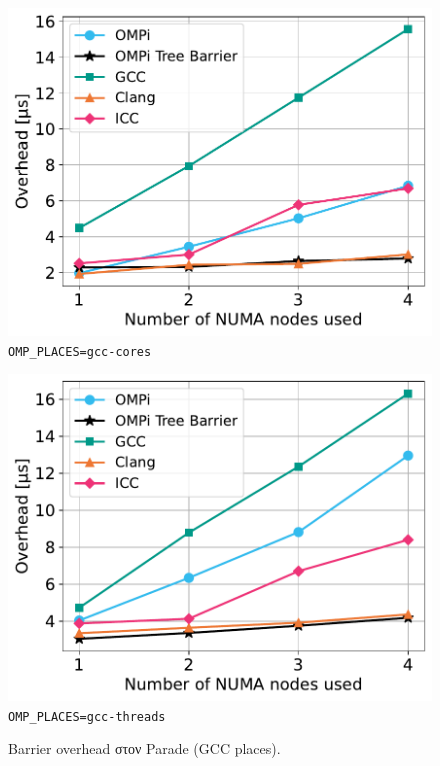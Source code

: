 \begin{figure}
    \centering
    \begin{minipage}{0.5\textwidth}
        \centering
        \includegraphics[width=1\textwidth]{Figures/epcc_20210823_175412/gcc-places_cores_close.pdf}
		\texttt{OMP\_PLACES=gcc-cores}
    \end{minipage}\hfill
    \begin{minipage}{0.5\textwidth}
        \centering
        \includegraphics[width=1\textwidth]{Figures/epcc_20210823_175412/gcc-places_threads_close.pdf}
        \texttt{OMP\_PLACES=gcc-threads}
    \end{minipage}
    \caption{Barrier overhead στον Parade (GCC places).}
    \label{fig:bo-parade-gcc-places}
\end{figure}

